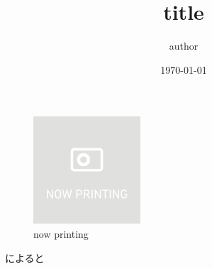 \documentclass[dvipdfmx, paper=a4, fontsize=10pt]{jlreq}
\title{title}
\author{author}
\date{\today}
\begin{document}
    \maketitle

    \begin{figure}
        \centering
        \includegraphics[width=40mm]{image/nowprinting.png}
        \caption{now printing}
    \end{figure}

    \cite{fuga}によると\cite{fuga, hoge}

    
    
\end{document}
